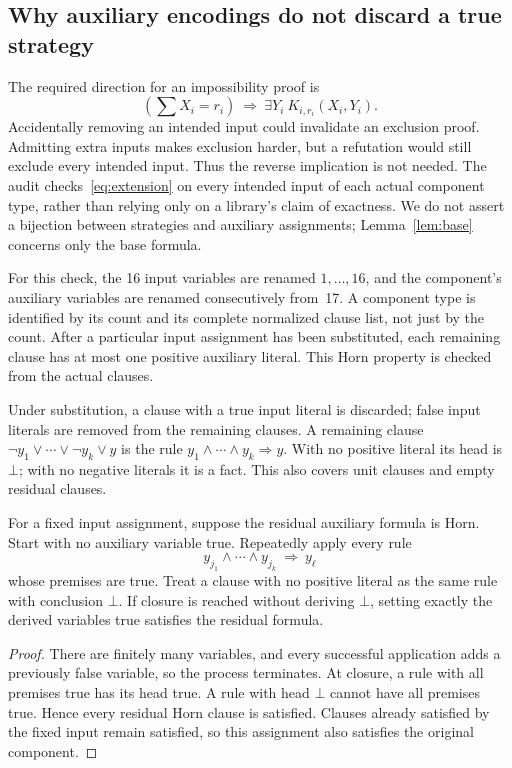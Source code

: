 \subsection{Why auxiliary encodings do not discard a true strategy}
The required direction for an impossibility proof is
\begin{equation}\label{eq:extension}
\left(\sum X_i=r_i\right)
\ \Longrightarrow\ \exists Y_i\ K_{i,r_i}(X_i,Y_i).
\end{equation}
Accidentally removing an intended input could invalidate an exclusion
proof. Admitting extra inputs makes exclusion harder, but a refutation
would still exclude every intended input. Thus the reverse implication
is not needed. The audit checks~\eqref{eq:extension} on every intended
input of each actual component type, rather than relying only on a
library's claim of exactness. We do not assert a bijection between
strategies and auxiliary assignments; Lemma~\ref{lem:base} concerns only
the base formula.

For this check, the 16 input variables are renamed $1,\ldots,16$, and the
component's auxiliary variables are renamed consecutively from~17. A
component type is identified by its count and its complete normalized
clause list, not just by the count. After a particular input assignment
has been substituted, each remaining clause has at most one positive
auxiliary literal. This Horn property is checked from the actual clauses.

Under substitution, a clause with a true input literal is discarded;
false input literals are removed from the remaining clauses. A remaining
clause $\neg y_1\lor\cdots\lor\neg y_k\lor y$ is the rule
$y_1\land\cdots\land y_k\Rightarrow y$. With no positive literal its
head is $\bot$; with no negative literals it is a fact. This also covers
unit clauses and empty residual clauses.

\begin{lemma}\label{lem:horn}
For a fixed input assignment, suppose the residual auxiliary formula is
Horn. Start with no auxiliary variable true. Repeatedly apply every rule
\[
y_{j_1}\land\cdots\land y_{j_k}\ \Longrightarrow\ y_\ell
\]
whose premises are true. Treat a clause with no positive literal as the
same rule with conclusion $\bot$. If closure is reached without deriving
$\bot$, setting exactly the derived variables true satisfies the residual
formula.
\end{lemma}
\begin{proof}
There are finitely many variables, and every successful application adds
a previously false variable, so the process terminates. At closure, a
rule with all premises true has its head true. A rule with head $\bot$
cannot have all premises true. Hence every residual Horn clause is
satisfied. Clauses already satisfied by the fixed input remain satisfied,
so this assignment also satisfies the original component.
\end{proof}

